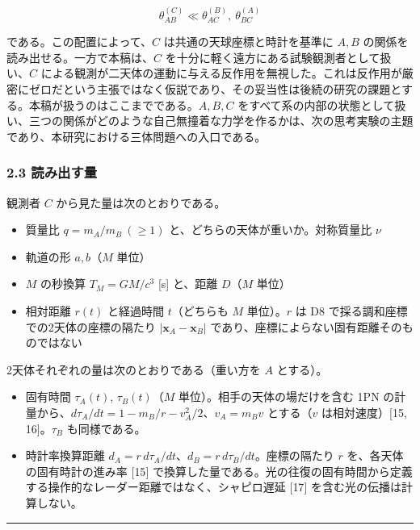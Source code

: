 \documentclass[
  a4paper,
]{ltjsarticle}
\providecommand{\tightlist}{%
  \setlength{\itemsep}{0pt}\setlength{\parskip}{0pt}}
\begin{document}
\[
\theta_{AB}^{(C)}\ll\theta_{AC}^{(B)},\ \theta_{BC}^{(A)}
\]

である。この配置によって、\(C\) は共通の天球座標と時計を基準に \(A, B\)
の関係を読み出せる。一方で本稿は、\(C\)
を十分に軽く遠方にある試験観測者として扱い、\(C\)
による観測が二天体の運動に与える反作用を無視した。これは反作用が厳密にゼロだという主張ではなく仮説であり、その妥当性は後続の研究の課題とする。本稿が扱うのはここまでである。\(A, B, C\)
をすべて系の内部の状態として扱い、三つの関係がどのような自己無撞着な力学を作るかは、次の思考実験の主題であり、本研究における三体問題への入口である。

\subsubsection{2.3 読み出す量}\label{ux8aadux307fux51faux3059ux91cf}

観測者 \(C\) から見た量は次のとおりである。

\begin{itemize}
\tightlist
\item
  質量比 \(q=m_A/m_B\ (\ge 1)\) と、どちらの天体が重いか。対称質量比
  \(\nu\)
\item
  軌道の形 \(a, b\)（\(M\) 単位）
\item
  \(M\) の秒換算 \(T_M=GM/c^3\) {[}s{]} と、距離 \(D\)（\(M\) 単位）
\item
  相対距離 \(r(t)\) と経過時間 \(t\)（どちらも \(M\) 単位）。\(r\) は D8
  で採る調和座標での2天体の座標の隔たり \(|\mathbf x_A-\mathbf x_B|\)
  であり、座標によらない固有距離そのものではない
\end{itemize}

2天体それぞれの量は次のとおりである（重い方を \(A\) とする）。

\begin{itemize}
\tightlist
\item
  固有時間 \(\tau_A(t)\), \(\tau_B(t)\)（\(M\)
  単位）。相手の天体の場だけを含む 1PN
  の計量から、\(d\tau_A/dt=1-m_B/r-v_A^2/2\)、\(v_A=m_Bv\) とする（\(v\)
  は相対速度）{[}15, 16{]}。\(\tau_B\) も同様である。
\item
  時計率換算距離
  \(d_A=r\,d\tau_A/dt\)、\(d_B=r\,d\tau_B/dt\)。座標の隔たり \(r\)
  を、各天体の固有時計の進み率 {[}15{]}
  で換算した量である。光の往復の固有時間から定義する操作的なレーダー距離ではなく、シャピロ遅延
  {[}17{]} を含む光の伝播は計算しない。
\end{itemize}

\begin{center}\rule{0.5\linewidth}{0.5pt}\end{center}
\end{document}
